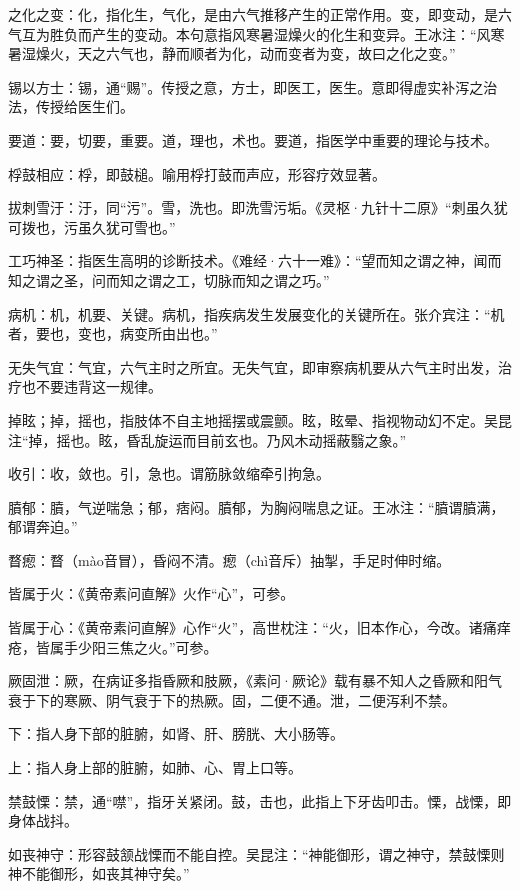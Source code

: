 \documentclass[draft,12pt]{ctexbook}
\begin{document}
\begin{jiaozhu}
	\item 之化之变：化，指化生，气化，是由六气推移产生的正常作用。变，即变动，是六气互为胜负而产生的变动。本句意指风寒暑湿燥火的化生和变异。王冰注：“风寒暑湿燥火，天之六气也，静而顺者为化，动而变者为变，故曰之化之变。”
	\item 锡以方士：锡，通“赐”。传授之意，方士，即医工，医生。意即得虚实补泻之治法，传授给医生们。
	\item 要道：要，切要，重要。道，理也，术也。要道，指医学中重要的理论与技术。
	\item 桴鼓相应：桴，即鼓槌。喻用桴打鼓而声应，形容疗效显著。
	\item 拔刺雪汙：汙，同“污”。雪，洗也。即洗雪污垢。《灵枢·九针十二原》“刺虽久犹可拨也，污虽久犹可雪也。”
	\item 工巧神圣：指医生高明的诊断技术。《难经·六十一难》：“望而知之谓之神，闻而知之谓之圣，问而知之谓之工，切脉而知之谓之巧。”
	\item 病机：机，机要、关键。病机，指疾病发生发展变化的关键所在。张介宾注：“机者，要也，变也，病变所由出也。”
	\item 无失气宜：气宜，六气主时之所宜。无失气宜，即审察病机要从六气主时出发，治疗也不要违背这一规律。
	\item 掉眩；掉，摇也，指肢体不自主地摇摆或震颤。眩，眩晕、指视物动幻不定。吴昆注“掉，摇也。眩，昏乱旋运而目前玄也。乃风木动摇蔽翳之象。”
	\item 收引：收，敛也。引，急也。谓筋脉敛缩牵引拘急。
	\item 膹郁：膹，气逆喘急；郁，痞闷。膹郁，为胸闷喘息之证。王冰注：“膹谓膹满，郁谓奔迫。”
	\item 瞀瘛：瞀（mào音冒），昏闷不清。瘛（chì音斥）抽掣，手足时伸时缩。
	\item 皆属于火：《黄帝素问直解》火作“心”，可参。
	\item 皆属于心：《黄帝素问直解》心作“火”，高世枕注：“火，旧本作心，今改。诸痛痒疮，皆属手少阳三焦之火。”可参。
	\item 厥固泄：厥，在病证多指昏厥和肢厥，《素问·厥论》载有暴不知人之昏厥和阳气衰于下的寒厥、阴气衰于下的热厥。固，二便不通。泄，二便泻利不禁。
	\item 下：指人身下部的脏腑，如肾、肝、膀胱、大小肠等。
	\item 上：指人身上部的脏腑，如肺、心、胃上口等。
	\item 禁鼓慄：禁，通“噤”，指牙关紧闭。鼓，击也，此指上下牙齿叩击。慄，战慄，即身体战抖。
	\item 如丧神守：形容鼓颔战慄而不能自控。吴昆注：“神能御形，谓之神守，禁鼓慄则神不能御形，如丧其神守矣。”

\end{jiaozhu}
\end{document}
